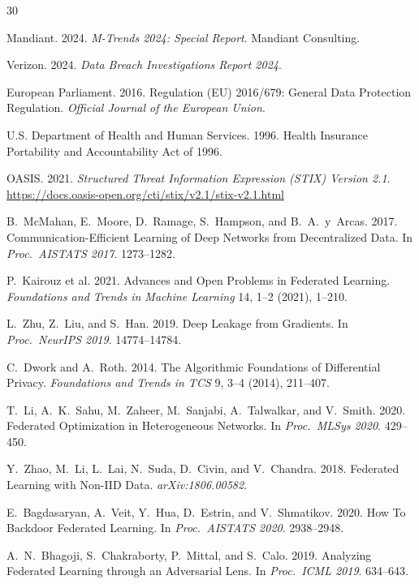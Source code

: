 \documentclass[sigconf,nonacm]{acmart}
\begin{document}
\sloppy

\begin{thebibliography}{30}

Mandiant. 2024. \textit{M-Trends 2024: Special Report}. Mandiant Consulting.

Verizon. 2024. \textit{Data Breach Investigations Report 2024}.

European Parliament. 2016. Regulation (EU) 2016/679: General Data Protection
Regulation. \textit{Official Journal of the European Union}.

U.S. Department of Health and Human Services. 1996. Health Insurance
Portability and Accountability Act of 1996.

OASIS. 2021. \textit{Structured Threat Information Expression (STIX) Version 2.1}.
\url{https://docs.oasis-open.org/cti/stix/v2.1/stix-v2.1.html}

B.~McMahan, E.~Moore, D.~Ramage, S.~Hampson, and B.~A.~y~Arcas. 2017.
Communication-Efficient Learning of Deep Networks from Decentralized Data.
In \textit{Proc.\ AISTATS 2017}. 1273--1282.

P.~Kairouz et al. 2021. Advances and Open Problems in Federated Learning.
\textit{Foundations and Trends in Machine Learning} 14, 1--2 (2021), 1--210.

L.~Zhu, Z.~Liu, and S.~Han. 2019. Deep Leakage from Gradients.
In \textit{Proc.\ NeurIPS 2019}. 14774--14784.

C.~Dwork and A.~Roth. 2014. The Algorithmic Foundations of Differential Privacy.
\textit{Foundations and Trends in TCS} 9, 3--4 (2014), 211--407.

T.~Li, A.~K.~Sahu, M.~Zaheer, M.~Sanjabi, A.~Talwalkar, and V.~Smith. 2020.
Federated Optimization in Heterogeneous Networks. In
\textit{Proc.\ MLSys 2020}. 429--450.

Y.~Zhao, M.~Li, L.~Lai, N.~Suda, D.~Civin, and V.~Chandra. 2018. Federated
Learning with Non-IID Data. \textit{arXiv:1806.00582}.

E.~Bagdasaryan, A.~Veit, Y.~Hua, D.~Estrin, and V.~Shmatikov. 2020. How To
Backdoor Federated Learning. In \textit{Proc.\ AISTATS 2020}. 2938--2948.

A.~N.~Bhagoji, S.~Chakraborty, P.~Mittal, and S.~Calo. 2019. Analyzing
Federated Learning through an Adversarial Lens. In \textit{Proc.\ ICML 2019}.
634--643.


\end{thebibliography}
\end{document}

